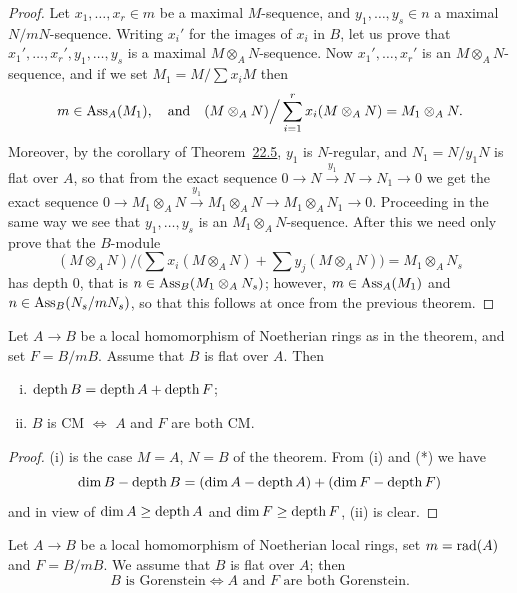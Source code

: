 \begin{proof}
Let $x_1, \ldots, x_r \in m$ be a maximal $M$-sequence, and $y_1, \ldots, y_s \in n$ a
maximal $N/mN$-sequence. Writing $x_i'$ for the images of $x_i$ in $B$, let us
prove that $x_1', \ldots, x_r', y_1, \ldots, y_s$ is a maximal $M \otimes_A N$-sequence. Now
$x_1', \ldots, x_r'$ is an $M \otimes_A N$-sequence, and if we set
$M_1 = M/\sum x_iM$ then
\[
  m \in \operatorname{Ass}_A(M_1), \quad \text{and} \quad (M \otimes_A N) \Big/ \sum_{i=1}^r x_i(M \otimes_A N) = M_1 \otimes_A N.
\]
Moreover, by the corollary of Theorem~\hyperref[thm:22.5]{22.5}, $y_1$ is $N$-regular, and
$N_1 = N/y_1N$ is flat over $A$, so that from the exact sequence
$0 \to N \xrightarrow{y_1} N \to N_1 \to 0$ we get the exact sequence
$0 \to M_1 \otimes_A N \xrightarrow{y_1} M_1 \otimes_A N \to M_1 \otimes_A N_1 \to 0$.
Proceeding in the same way we see that $y_1, \ldots, y_s$ is an
$M_1 \otimes_A N$-sequence. After this we need only prove that the $B$-module
\[
  (M \otimes_A N) \Big/ \Big( \sum x_i(M \otimes_A N) + \sum y_j(M \otimes_A N) \Big) = M_1 \otimes_A N_s
\]
has depth $0$, that is $n \in \operatorname{Ass}_B(M_1 \otimes_A N_s)$; however,
$m \in \operatorname{Ass}_A(M_1)$ and $n \in \operatorname{Ass}_B(N_s/mN_s)$, so that this follows at once from
the previous theorem.
\end{proof}

\begin{corollary*}
Let $A \to B$ be a local homomorphism of Noetherian rings as in the theorem, and
set $F = B/mB$. Assume that $B$ is flat over $A$. Then
\begin{enumerate}[(i)]
  \item $\operatorname{depth} B = \operatorname{depth} A + \operatorname{depth} F$;
  \item $B$ is CM $\iff$ $A$ and $F$ are both CM.
\end{enumerate}
\end{corollary*}

\begin{proof}
(i) is the case $M = A$, $N = B$ of the theorem. From (i) and (*) we have
\[
  \dim B - \operatorname{depth} B = (\dim A - \operatorname{depth} A) + (\dim F - \operatorname{depth} F)
\]
and in view of $\dim A \ge \operatorname{depth} A$ and $\dim F \ge \operatorname{depth} F$, (ii) is clear.
\end{proof}

\begin{theorem}\label{thm:23.4}
Let $A \to B$ be a local homomorphism of Noetherian local rings, set $m = \operatorname{rad}(A)$
and $F = B/mB$. We assume that $B$ is flat over $A$; then
\[
  B \text{ is Gorenstein} \iff A \text{ and } F \text{ are both Gorenstein}.
\]
\end{theorem}

